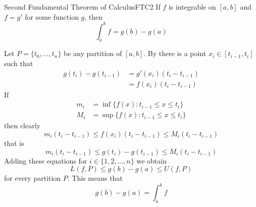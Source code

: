 \documentclass[12pt]{report}
\begin{document}
\begin{namthm}{Second Fundamental Theorem of Calculus}{FTC2}
    If $f$ is integrable on $[a,b]$ and $f = g'$ for some function $g$, then \begin{equation*}
        \int_a^bf = g(b) - g(a)
    \end{equation*}
\end{namthm}
\begin{proof*}{}{}
    Let $P = \{t_0,...,t_n\}$ be any partition of $[a,b]$. By  there is a point $x_i \in [t_{i-1},t_i]$ such that \begin{align*}
        g(t_i) - g(t_{i-1}) &= g'(x_i)(t_i-t_{i-1}) \\
        &= f(x_i)(t_i-t_{i-1})
    \end{align*}
    If \begin{align*}
        m_i &= \inf\{f(x):t_{i-1} \leq x \leq t_i\} \\
        M_i &= \sup\{f(x):t_{i-1} \leq x \leq t_i\}
    \end{align*}
    then clearly \begin{equation*}
        m_i(t_i-t_{i-1}) \leq f(x_i)(t_i-t_{i-1}) \leq M_i(t_i-t_{i-1})
    \end{equation*}
    that is \begin{equation*}
        m_i(t_i-t_{i-1}) \leq g(t_i) - g(t_{i-1}) \leq M_i(t_i-t_{i-1})
    \end{equation*}
    Adding these equations for $i \in \{1,2,...,n\}$ we obtain \begin{equation*}
        L(f,P) \leq g(b) - g(a) \leq U(f,P)
    \end{equation*}
    for every partition $P$. This means that \begin{equation*}
        g(b) - g(a) = \int_a^bf
    \end{equation*}
\end{proof*}
\end{document}
